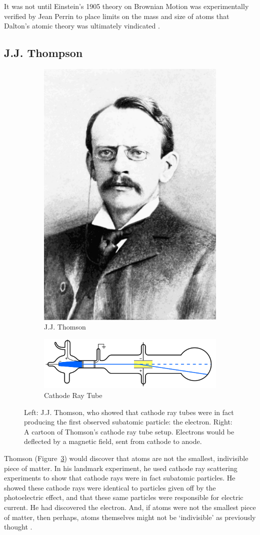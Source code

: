 It was not until Einstein's 1905 theory on Brownian Motion was experimentally
verified by Jean Perrin to place limits on the mass and size of atoms that
Dalton's atomic theory was ultimately vindicated \cite{Patterson200750}.

\subsection{J.J. Thompson}

\begin{figure}[ht]
	\centering
	\begin{subfigure}{.4\textwidth}
		\centering
		\includegraphics[width=0.4\linewidth]{./figures/jjthomson.png}
		\caption{J.J. Thomson  \cite{PopularScience1899}}
		\label{fig:thomsonportrait}
	\end{subfigure}%
	\begin{subfigure}{0.6\textwidth}
		\centering
		\includegraphics[width=0.4\linewidth]{./figures/cathoderaytube.png}
		\caption{Cathode Ray Tube  \cite{Kurzon2010}}
		\label{fig:thomsoncathode}
	\end{subfigure}
	\caption{ 
		Left: J.J. Thomson, who showed that cathode ray tubes were in fact producing
		the first observed subatomic particle: the electron. Right: A cartoon of
		Thomson's cathode ray tube setup. Electrons would be deflected by a magnetic
		field, sent from cathode to anode.
	}
	\label{fig:jjthomson}
\end{figure}

Thomson (Figure~\ref{fig:jjthomson}) would discover that atoms are not the
smallest, indivisible piece of matter. In his landmark experiment, he used
cathode ray scattering experiments to show that cathode rays were in fact
subatomic particles. He showed these cathode rays were identical to particles
given off by the photoelectric effect, and that these same particles were
responsible for electric current. He had discovered the electron. And, if atoms
were not the smallest piece of matter, then perhaps, atoms themselves might not
be `indivisible' as previously thought \cite{nobelthomson2014}.

